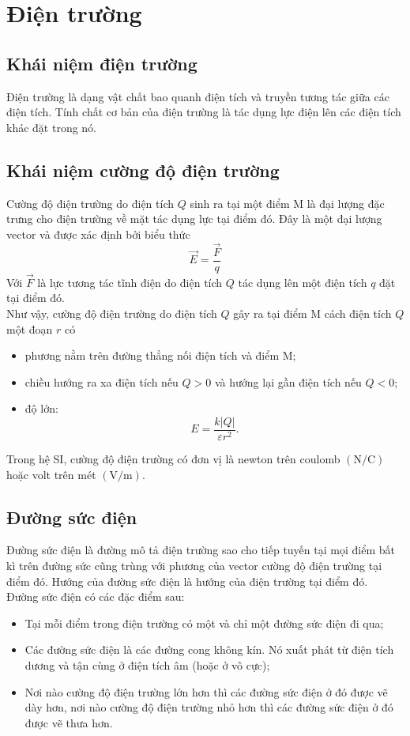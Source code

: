 \section{Điện trường}
\subsection{Khái niệm điện trường}
Điện trường là dạng vật chất bao quanh điện tích và truyền tương tác giữa các điện tích. Tính chất cơ bản của điện trường là tác dụng lực điện lên các điện tích khác đặt trong nó.
\subsection{Khái niệm cường độ điện trường}
Cường độ điện trường do điện tích $Q$ sinh ra tại một điểm M là đại lượng đặc trưng cho điện trường về mặt tác dụng lực tại điểm đó. Đây là một đại lượng vector và được xác định bởi biểu thức
$$\vec{E}=\dfrac{\vec{F}}{q}$$
Với $\vec{F}$ là lực tương tác tĩnh điện do điện tích $Q$ tác dụng lên một điện tích $q$ đặt tại điểm đó.\\
Như vậy, cường độ điện trường do điện tích $Q$ gây ra tại điểm M cách điện tích $Q$ một đoạn $r$ có
\begin{itemize}
	\item phương nằm trên đường thẳng nối điện tích và điểm M;
	\item chiều hướng ra xa điện tích nếu $Q>0$ và hướng lại gần điện tích nếu $Q<0$;
	\item độ lớn:
	$$E=\dfrac{k\left|Q\right|}{\varepsilon r^2}.$$
\end{itemize}
Trong hệ SI, cường độ điện trường có đơn vị là newton trên coulomb $\left(\si{\newton/\coulomb}\right)$ hoặc volt trên mét $\left(\si{\volt/\meter}\right)$.
\subsection{Đường sức điện}
Đường sức điện là đường mô tả điện trường sao cho tiếp tuyến tại mọi điểm bất kì trên đường sức cũng trùng với phương của vector cường độ điện trường tại điểm đó. Hướng của đường sức điện là hướng của điện trường tại điểm đó.\\
Đường sức điện có các đặc điểm sau:
\begin{itemize}
	\item Tại mỗi điểm trong điện trường có một và chỉ một đường sức điện đi qua;
	\item Các đường sức điện là các đường cong không kín. Nó xuất phát từ điện tích dương và tận cùng ở điện tích âm (hoặc ở vô cực);
	\item Nơi nào cường độ điện trường lớn hơn thì các đường sức điện ở đó được vẽ dày hơn, nơi nào cường độ điện trường nhỏ hơn thì các đường sức điện ở đó được vẽ thưa hơn.
\end{itemize}
